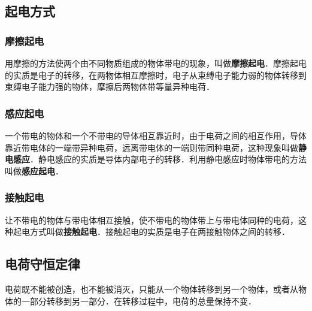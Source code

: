 \subsection{起电方式}

\subsubsection{摩擦起电}

用摩擦的方法使两个由不同物质组成的物体带电的现象，叫做\textbf{摩擦起电}．摩擦起电的实质是电子的转移，在两物体相互摩擦时，电子从束缚电子能力弱的物体转移到束缚电子能力强的物体，摩擦后两物体带等量异种电荷．

\subsubsection{感应起电}

一个带电的物体和一个不带电的导体相互靠近时，由于电荷之间的相互作用，导体靠近带电体的一端带异种电荷，远离带电体的一端则带同种电荷，这种现象叫做\textbf{静电感应}．静电感应的实质是导体内部电子的转移．利用静电感应时物体带电的方法叫做\textbf{感应起电}．

\subsubsection{接触起电}

让不带电的物体与带电体相互接触，使不带电的物体带上与带电体同种的电荷，这种起电方式叫做\textbf{接触起电}．接触起电的实质是电子在两接触物体之间的转移．

\subsection{电荷守恒定律}

电荷既不能被创造，也不能被消灭，只能从一个物体转移到另一个物体，或者从物体的一部分转移到另一部分．在转移过程中，电荷的总量保持不变．
